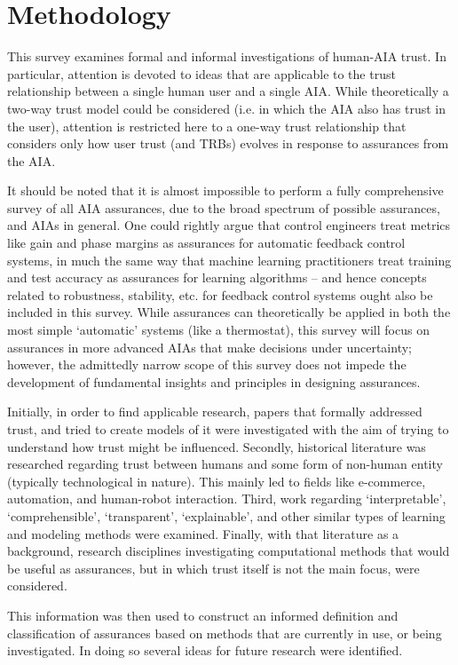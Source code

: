 \section{Methodology} \label{sec:methodology}
    This survey examines formal and informal investigations of human-AIA trust. In particular, attention is devoted to ideas that are applicable to the trust relationship between a single human user and a single AIA. While theoretically a two-way trust model could be considered (i.e. in which the AIA also has trust in the user), attention is restricted here to a one-way trust relationship that considers only how user trust (and TRBs) evolves in response to assurances from the AIA. 

    It should be noted that it is almost impossible to perform a fully comprehensive survey of all AIA assurances, due to the broad spectrum of possible assurances, and AIAs in general. One could rightly argue that control engineers treat metrics like gain and phase margins as assurances for automatic feedback control systems, in much the same way that  machine learning practitioners treat training and test accuracy as assurances for learning algorithms -- and hence concepts related to robustness, stability, etc. for feedback control systems ought also be included in this survey. While assurances can theoretically be applied in both the most simple `automatic' systems (like a thermostat), this survey will focus on assurances in more advanced AIAs that make decisions under uncertainty; however, the admittedly narrow scope of this survey does not impede the development of fundamental insights and principles in designing assurances.

    Initially, in order to find applicable research, papers that formally addressed trust, and tried to create models of it were investigated with the aim of trying to understand how trust might be influenced. Secondly, historical literature was researched regarding trust between humans and some form of non-human entity (typically technological in nature). This mainly led to fields like e-commerce, automation, and human-robot interaction. Third, work regarding `interpretable', `comprehensible', `transparent', `explainable', and other similar types of learning and modeling methods were examined. Finally, with that literature as a background, research disciplines investigating computational methods that would be useful as assurances, but in which trust itself is not the main focus, were considered.

    This information was then used to construct an informed definition and classification of assurances based on methods that are currently in use, or being investigated. In doing so several ideas for future research were identified.
